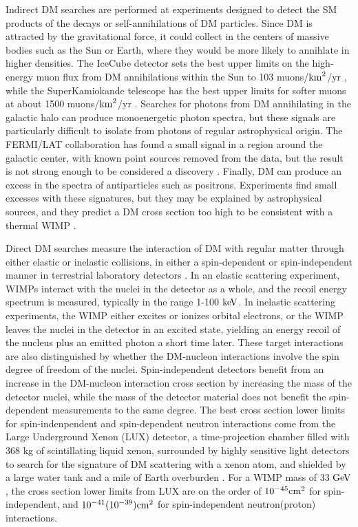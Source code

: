 \indent Indirect DM searches are performed at experiments designed to detect the SM products of the decays or self-annihilations of DM particles. Since DM is attracted by the gravitational force, it could collect in the centers of massive bodies such as the Sun or Earth, where they would be more likely to annihlate in higher densities. The IceCube detector sets the best upper limits on the high-energy muon flux from DM annihilations within the Sun to 103 muons/$\rm{km}^2$/yr \cite{PhysRevLett.110.131302}, while the SuperKamiokande telescope has the best upper limits for softer muons at about 1500 muons/$\rm{km}^2$/yr \cite{0004-637X-742-2-78}. Searches for photons from DM annihilating in the galactic halo can produce monoenergetic photon spectra, but these signals are particularly difficult to isolate from photons of regular astrophysical origin. The FERMI/LAT collaboration has found a small signal in a region around the galactic center, with known point sources removed from the data, but the result is not strong enough to be considered a discovery \cite{Ackermann:2013uma}. Finally, DM can produce an excess in the spectra of antiparticles such as positrons. Experiments find small excesses with these signatures, but they may be explained by astrophysical sources, and they predict a DM cross section too high to be consistent with a thermal WIMP \cite{Agashe:2014kda}.

\indent Direct DM searches measure the interaction of DM with regular matter through either elastic or inelastic collisions, in either a spin-dependent or spin-independent manner in terrestrial laboratory detectors \cite{Bertone:2004pz}. In an elastic scattering experiment, WIMPs interact with the nuclei in the detector as a whole, and the recoil energy spectrum is measured, typically in the range 1-100 $\mathrm{ke\kern -0.1em V}$. In inelastic scattering experiments, the WIMP either excites or ionizes orbital electrons, or the WIMP leaves the nuclei in the detector in an excited state, yielding an energy recoil of the nucleus plus an emitted photon a short time later. These target interactions are also distinguished by whether the DM-nucleon interactions involve the spin degree of freedom of the nuclei. Spin-independent detectors benefit from an increase in the DM-nucleon interaction cross section by increasing the mass of the detector nuclei, while the mass of the detector material does not benefit the spin-dependent measurements to the same degree. The best cross section lower limits for spin-indenpendent and spin-dependent neutron interactions come from the Large Underground Xenon (LUX) detector, a time-projection chamber filled with 368 kg of scintillating liquid xenon, surrounded by highly sensitive light detectors to search for the signature of DM scattering with a xenon atom, and shielded by a large water tank and a mile of Earth overburden \cite{Akerib:2016lao}. For a WIMP mass of 33 $\mathrm{Ge\kern -0.1em V}$, the cross section lower limits from LUX are on the order of $10^{-45} \rm{cm}^2$ for spin-independent, and $10^{-41}(10^{-39}) \rm{cm}^2$ for spin-independent neutron(proton) interactions.

